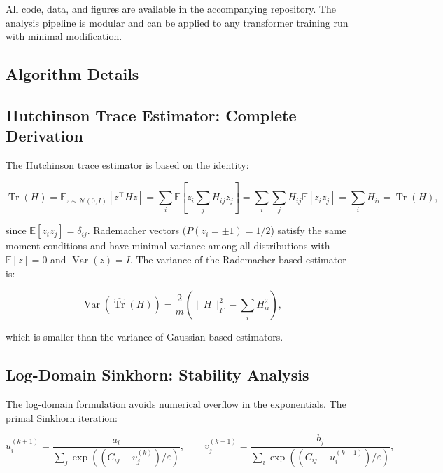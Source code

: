 \documentclass[12pt,twoside]{article}
\newcommand{\Tr}{\operatorname{Tr}}
\newcommand{\Var}{\operatorname{Var}}
\begin{document}
All code, data, and figures are available in the accompanying repository.
The analysis pipeline is modular and can be applied to any transformer
training run with minimal modification.




\begin{appendix}
\section{Algorithm Details}

\subsection{Hutchinson Trace Estimator: Complete Derivation}

The Hutchinson trace estimator is based on the identity:

\begin{equation}
  \Tr(H) = \mathbb{E}_{z \sim \mathcal{N}(0,I)}[z^\top H z]
  = \sum_i \mathbb{E}[z_i \sum_j H_{ij} z_j]
  = \sum_i \sum_j H_{ij} \mathbb{E}[z_i z_j]
  = \sum_i H_{ii} = \Tr(H),
\end{equation}

since $\mathbb{E}[z_i z_j] = \delta_{ij}$. Rademacher vectors
($P(z_i = \pm 1) = 1/2$) satisfy the same moment conditions and have
minimal variance among all distributions with $\mathbb{E}[z] = 0$ and
$\Var(z) = I$. The variance of the Rademacher-based estimator is:

\begin{equation}
  \Var(\widehat{\Tr}(H)) = \frac{2}{m} \left( \|H\|_F^2 - \sum_i H_{ii}^2 \right),
\end{equation}

which is smaller than the variance of Gaussian-based estimators.

\subsection{Log-Domain Sinkhorn: Stability Analysis}

The log-domain formulation avoids numerical overflow in the exponentials.
The primal Sinkhorn iteration:

\begin{equation}
  u_i^{(k+1)} = \frac{a_i}{\sum_j \exp((C_{ij} - v_j^{(k)})/\varepsilon)},
  \qquad
  v_j^{(k+1)} = \frac{b_j}{\sum_i \exp((C_{ij} - u_i^{(k+1)})/\varepsilon)},
\end{equation}


\end{appendix}
\end{document}
